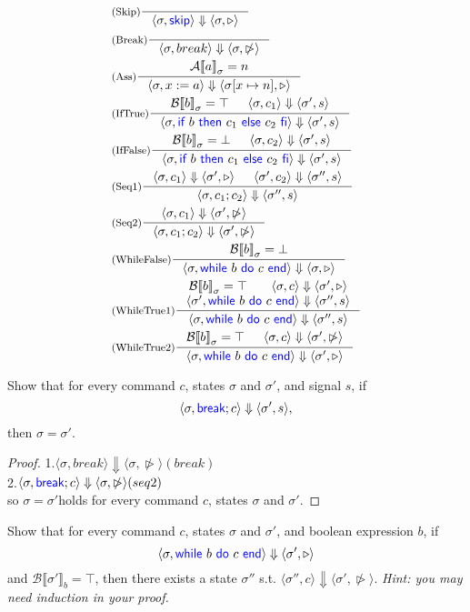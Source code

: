 \documentclass[11pt,a4paper]{article}
\let\sCont\triangleright
\let\sBreak\ntriangleright
\newcommand{\pair}[1]{\langle #1 \rangle}
\newcommand{\evalA}[2]{{\mathcal{A}\llbracket #1 \rrbracket}_{#2}}
\newcommand{\evalB}[2]{{\mathcal{B}\llbracket #1 \rrbracket}_{#2}}
\newcommand{\evalCsig}[4]{\pair{#1, #2} \Downarrow \pair{#3, #4}}
\newcommand{\kword}[1]{{\color{blue} \textsf{#1}}}
\newcommand{\Skip}{\kword{skip}}
\newcommand{\If}{\kword{if}}
\newcommand{\Then}{\kword{then}}
\newcommand{\Else}{\kword{else}}
\newcommand{\Fi}{\kword{fi}}
\newcommand{\While}{\kword{while}}
\newcommand{\Do}{\kword{do}}
\newcommand{\End}{\kword{end}}
\newcommand{\Break}{\kword{break}}
\begin{document}
\begin{solution}
\begin{align*}
&\inference[(Skip)]{}{\evalCsig{\sigma}{\Skip}{\sigma}{\sCont}} \\
&\inference[(Break)]{}{\evalCsig{\sigma}{break}{\sigma}{\sBreak}} \\
&\inference[(Ass)]{\evalA{a}{\sigma}=n}{\evalCsig{\sigma}{x:=a}{\sigma[x\mapsto n]}{\sCont}} \\
&\inference[(IfTrue)]{\evalB{b}{\sigma}=\top & \evalCsig{\sigma}{c_1}{\sigma'}{s}}
{\evalCsig{\sigma}{\If~b~\Then~c_1~\Else~c_2~\Fi}{\sigma'}{s}} \\
&\inference[(IfFalse)]{\evalB{b}{\sigma}=\bot & \evalCsig{\sigma}{c_2}{\sigma'}{s}}
{\evalCsig{\sigma}{\If~b~\Then~c_1~\Else~c_2~\Fi}{\sigma'}{s}} \\
&\inference[(Seq1)]{\evalCsig{\sigma}{c_1}{\sigma'}{\sCont} & \evalCsig{\sigma'}{c_2}{\sigma''}{s}}
{\evalCsig{\sigma}{c_1;c_2}{\sigma''}{s}} \\
&\inference[(Seq2)]{\evalCsig{\sigma}{c_1}{\sigma'}{\sBreak}}
{\evalCsig{\sigma}{c_1;c_2}{\sigma'}{\sBreak}} \\
&\inference[(WhileFalse)]{\evalB{b}{\sigma}=\bot}
{\evalCsig{\sigma}{\While~b~\Do~c~\End}{\sigma}{\sCont}} \\
	&\inference[(WhileTrue1)]{\evalB{b}{\sigma}=\top & \evalCsig{\sigma}{c}{\sigma'}{\sCont} \\
	\evalCsig{\sigma'}{\While~b~\Do~c~\End}{\sigma''}{s}}{\evalCsig{\sigma}{\While~b~\Do~c~\End}{\sigma''}{s}}\\
	&\inference[(WhileTrue2)]{\evalB{b}{\sigma}=\top & \evalCsig{\sigma}{c}{\sigma'}{\sBreak}}{\evalCsig{\sigma}{\While~b~\Do~c~\End}{\sigma'}{\sCont}}
\end{align*}
\end{solution}

\subproblem Show that for every command $c$, states $\sigma$ and $\sigma'$, and signal $s$,
if $$\evalCsig{\sigma}{\Break;c}{\sigma'}{s},$$ then $\sigma=\sigma'$.

\begin{proof}
    1.$\evalCsig{\sigma}{break}{\sigma}{\sBreak}(break)$\\
    2.$\evalCsig{\sigma}{\Break;c}{\sigma}{\sBreak}(seq2)$\\
    so $\sigma = \sigma '$holds for every command $c$, states $\sigma$ and $\sigma'$.
\end{proof}

\subproblem Show that for every command $c$, states $\sigma$ and $\sigma'$, and boolean expression $b$,
if $$\evalCsig{\sigma}{\While~b~\Do~c~\End}{\sigma'}{\sCont}$$ and $\evalB{\sigma'}{b}=\top$,
then there exists a state $\sigma''$ s.t. $\evalCsig{\sigma''}{c}{\sigma'}{\sBreak}$.
\textit{Hint: you may need induction in your proof.}
\end{document}
